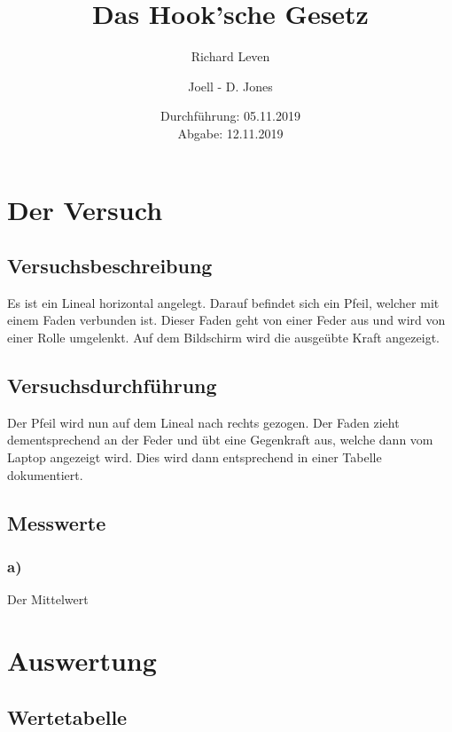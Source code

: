 \documentclass[captions=tableheading]{scrartcl}
\title{Das Hook'sche Gesetz}
\author{Richard Leven \and Joell - D. Jones}
\date{
    Durchführung: 05.11.2019\\
    Abgabe: 12.11.2019
}
\begin{document}
\maketitle
\section{Der Versuch}
\subsection{Versuchsbeschreibung}

Es ist ein Lineal horizontal angelegt. Darauf befindet sich ein Pfeil, welcher mit einem Faden verbunden ist. Dieser Faden geht von einer Feder aus und wird von einer Rolle umgelenkt. Auf dem Bildschirm wird die ausgeübte Kraft angezeigt.

\subsection{Versuchsdurchführung}

Der Pfeil wird nun auf dem Lineal nach rechts gezogen. Der Faden zieht dementsprechend an der Feder und übt eine Gegenkraft aus, welche dann vom Laptop angezeigt wird. Dies wird dann entsprechend in einer Tabelle dokumentiert.

\subsection{Messwerte}

\subsubsection{a)}

Der Mittelwert 

\section{Auswertung}
\subsection{Wertetabelle}
\end{document}
